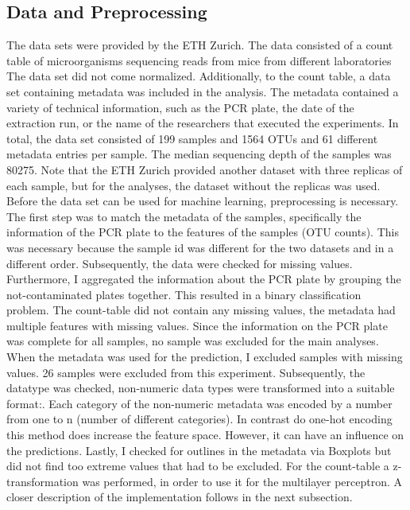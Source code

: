 \documentclass{svproc}
\begin{document}
\subsection{Data and Preprocessing}

The data sets were provided by the ETH Zurich. The data consisted of a count table of microorganisms sequencing reads from mice from different laboratories The data set did not come normalized. Additionally, to the count table, a data set containing metadata was included in the analysis. The metadata contained a variety of technical information, such as the PCR plate, the date of the extraction run, or the name of the researchers that executed the experiments. In total, the data set consisted of 199 samples and 1564 OTUs and 61 different metadata entries per sample. The median sequencing depth of the samples was 80275. Note that the ETH Zurich provided another dataset with three replicas of each sample, but for the analyses, the dataset without the replicas was used.\\


Before the data set can be used for machine learning, preprocessing is necessary. The first step was to match the metadata of the samples, specifically the information of the PCR plate to the features of the samples (OTU counts). This was necessary because the sample id was different for the two datasets and in a different order. Subsequently, the data were checked for missing values. Furthermore, I aggregated the information about the PCR plate by grouping the not-contaminated plates together. This resulted in a binary classification problem. The count-table did not contain any missing values, the metadata had multiple features with missing values. Since the information on the PCR plate was complete for all samples, no sample was excluded for the main analyses. When the metadata was used for the prediction, I excluded samples with missing values. 26 samples were excluded from this experiment. Subsequently, the datatype was checked, non-numeric data types were transformed into a suitable format:. Each category of the non-numeric metadata was encoded by a number from one to n (number of different categories). In contrast do one-hot encoding this method does increase the feature space. However, it can have an influence on the predictions. 
Lastly, I checked for outlines in the metadata via Boxplots but did not find too extreme values that had to be excluded. For the count-table a z-transformation was performed, in order to use it for the multilayer perceptron. A closer description of the implementation follows in the next subsection.
\end{document}
